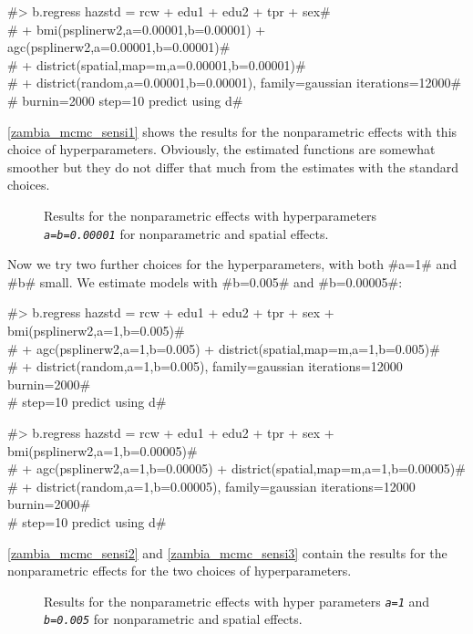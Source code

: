 \documentclass[11pt,a4paper,twoside]{bayesxreport}
\begin{document}
#> b.regress hazstd = rcw + edu1 + edu2 + tpr + sex#\\
#  + bmi(psplinerw2,a=0.00001,b=0.00001) + agc(psplinerw2,a=0.00001,b=0.00001)#\\
#  + district(spatial,map=m,a=0.00001,b=0.00001)#\\
#  + district(random,a=0.00001,b=0.00001), family=gaussian iterations=12000#\\
#  burnin=2000 step=10 predict using d#


\autoref{zambia_mcmc_sensi1} shows the results for the nonparametric
effects with this choice of hyperparameters. Obviously, the
estimated functions are somewhat smoother but they do not differ
that much from the estimates with the standard choices.

\begin{figure}[ht]
\begin{center}
{\it\caption{Results for the nonparametric effects with
hyperparameters {\em\tt a=b=0.00001} for nonparametric and spatial
effects.\label{zambia_mcmc_sensi1}}}
\end{center}
\end{figure}

Now we try two further choices for the hyperparameters, with both
#a=1# and #b# small. We estimate models with #b=0.005# and
#b=0.00005#:

#> b.regress hazstd = rcw + edu1 + edu2 + tpr + sex + bmi(psplinerw2,a=1,b=0.005)#\\
#  + agc(psplinerw2,a=1,b=0.005) + district(spatial,map=m,a=1,b=0.005)#\\
#  + district(random,a=1,b=0.005), family=gaussian iterations=12000 burnin=2000#\\
#  step=10 predict using d#

#> b.regress hazstd = rcw + edu1 + edu2 + tpr + sex + bmi(psplinerw2,a=1,b=0.00005)#\\
#  + agc(psplinerw2,a=1,b=0.00005) + district(spatial,map=m,a=1,b=0.00005)#\\
#  + district(random,a=1,b=0.00005), family=gaussian iterations=12000 burnin=2000#\\
#  step=10 predict using d#

\autoref{zambia_mcmc_sensi2} and \autoref{zambia_mcmc_sensi3}
contain the results for the nonparametric effects for the two
choices of hyperparameters.

\begin{figure}[ht]
\begin{center}
{\it\caption{Results for the nonparametric effects with hyper
parameters {\em\tt a=1} and {\em\tt b=0.005} for nonparametric and
spatial effects.\label{zambia_mcmc_sensi2}}}
\end{center}
\end{figure}
\end{document}
